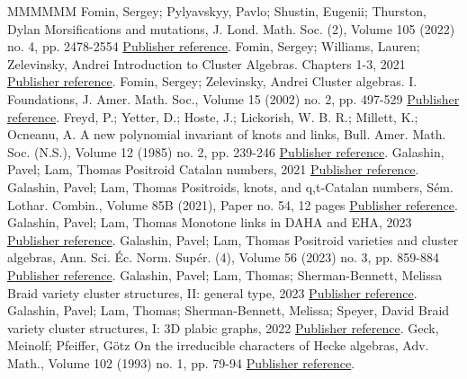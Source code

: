 \begin{thebibliography}{MMMMMM}
 Fomin, Sergey; Pylyavskyy, Pavlo; Shustin, Eugenii; Thurston, Dylan Morsifications and mutations, J. Lond. Math. Soc. (2), Volume 105 (2022) no. 4, pp. 2478-2554 \href{https://alco.centre-mersenne.org/articles/10.5802/alco.345/#FPST}{Publisher reference}.
 Fomin, Sergey; Williams, Lauren; Zelevinsky, Andrei Introduction to Cluster Algebras. Chapters 1-3, 2021 \href{https://alco.centre-mersenne.org/articles/10.5802/alco.345/#FWZ_book}{Publisher reference}.
 Fomin, Sergey; Zelevinsky, Andrei Cluster algebras. I. Foundations, J. Amer. Math. Soc., Volume 15 (2002) no. 2, pp. 497-529 \href{https://alco.centre-mersenne.org/articles/10.5802/alco.345/#FZ}{Publisher reference}.
 Freyd, P.; Yetter, D.; Hoste, J.; Lickorish, W. B. R.; Millett, K.; Ocneanu, A. A new polynomial invariant of knots and links, Bull. Amer. Math. Soc. (N.S.), Volume 12 (1985) no. 2, pp. 239-246 \href{https://alco.centre-mersenne.org/articles/10.5802/alco.345/#HOMFLY}{Publisher reference}.
 Galashin, Pavel; Lam, Thomas Positroid Catalan numbers, 2021 \href{https://alco.centre-mersenne.org/articles/10.5802/alco.345/#GL_cat_combin}{Publisher reference}.
 Galashin, Pavel; Lam, Thomas Positroids, knots, and q,t-Catalan numbers, Sém. Lothar. Combin., Volume 85B (2021), Paper no. 54, 12 pages \href{https://alco.centre-mersenne.org/articles/10.5802/alco.345/#GL_qtcat}{Publisher reference}.
 Galashin, Pavel; Lam, Thomas Monotone links in DAHA and EHA, 2023 \href{https://alco.centre-mersenne.org/articles/10.5802/alco.345/#GL_EHA}{Publisher reference}.
 Galashin, Pavel; Lam, Thomas Positroid varieties and cluster algebras, Ann. Sci. Éc. Norm. Supér. (4), Volume 56 (2023) no. 3, pp. 859-884 \href{https://alco.centre-mersenne.org/articles/10.5802/alco.345/#GL_cluster}{Publisher reference}.
 Galashin, Pavel; Lam, Thomas; Sherman-Bennett, Melissa Braid variety cluster structures, II: general type, 2023 \href{https://alco.centre-mersenne.org/articles/10.5802/alco.345/#GLSBS2}{Publisher reference}.
 Galashin, Pavel; Lam, Thomas; Sherman-Bennett, Melissa; Speyer, David Braid variety cluster structures, I: 3D plabic graphs, 2022 \href{https://alco.centre-mersenne.org/articles/10.5802/alco.345/#GLSBS1}{Publisher reference}.
 Geck, Meinolf; Pfeiffer, Götz On the irreducible characters of Hecke algebras, Adv. Math., Volume 102 (1993) no. 1, pp. 79-94 \href{https://alco.centre-mersenne.org/articles/10.5802/alco.345/#GePf}{Publisher reference}.

\end{thebibliography}
